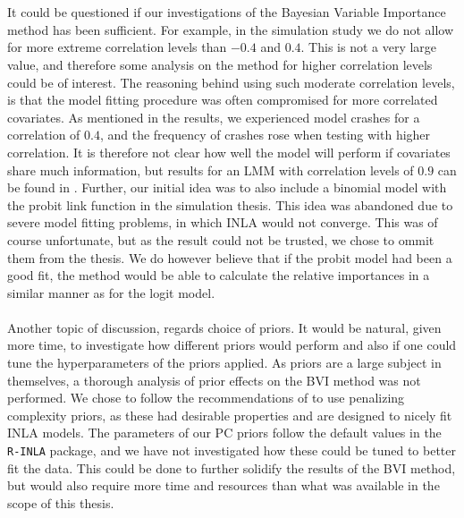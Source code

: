\\
\\
It could be questioned if our investigations of the Bayesian Variable Importance method has been sufficient. For example, in the simulation study we do not allow for more extreme correlation levels than $-0.4$ and $0.4$. This is not a very large value, and therefore some analysis on the method for higher correlation levels could be of interest. The reasoning behind using such moderate correlation levels, is that the model fitting procedure was often compromised for more correlated covariates. As mentioned in the results, we experienced model crashes for a correlation of $0.4$, and the frequency of crashes rose when testing with higher correlation. It is therefore not clear how well the model will perform if covariates share much information, but results for an LMM with correlation levels of $0.9$ can be found in \citet{Arnstad}. Further, our initial idea was to also include a binomial model with the probit link function in the simulation thesis. This idea was abandoned due to severe model fitting problems, in which INLA would not converge. This was of course unfortunate, but as the result could not be trusted, we chose to ommit them from the thesis. We do however believe that if the probit model had been a good fit, the method would be able to calculate the relative importances in a similar manner as for the logit model.
\\
\\
Another topic of discussion, regards choice of priors. It would be natural, given more time, to investigate how different priors would perform and also if one could tune the hyperparameters of the priors applied. As priors are a large subject in themselves, a thorough analysis of prior effects on the BVI method was not performed. We chose to follow the recommendations of \citet{simpson2017penalising} to use penalizing complexity priors, as these had desirable properties and are designed to nicely fit INLA models. The parameters of our PC priors follow the default values in the \texttt{R-INLA} package, and we have not investigated how these could be tuned to better fit the data. This could be done to further solidify the results of the BVI method, but would also require more time and resources than what was available in the scope of this thesis. 
\\
\\
